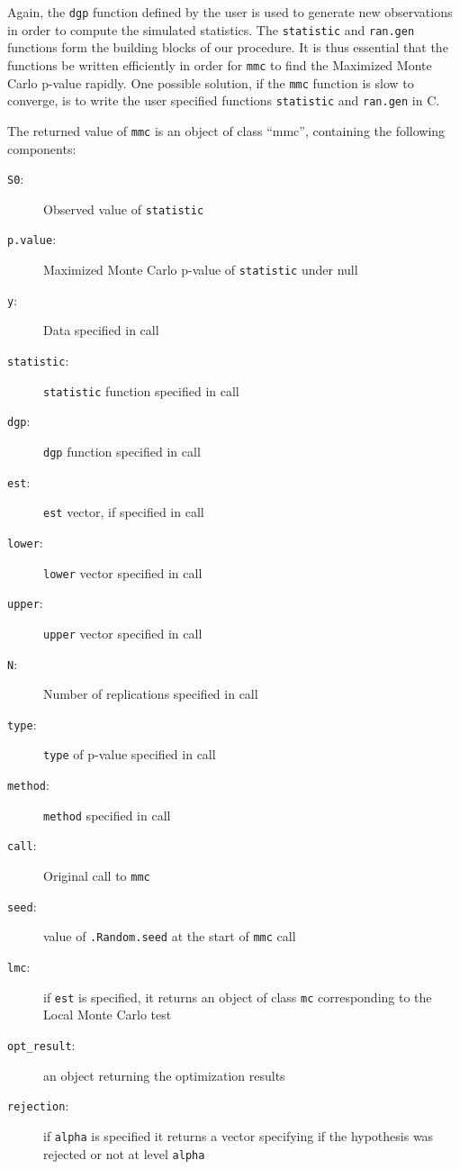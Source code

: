 \documentclass[11pt]{article}\usepackage[]{graphicx}\usepackage[]{color}
\let\proglang=\textsf
\let\code=\texttt
\begin{document}
	Again, the \code{dgp} function defined by the user is used to generate new observations in order to compute the simulated statistics. The \code{statistic} and \code{ran.gen} functions form the building blocks of our procedure. It is thus essential that the functions be written efficiently in order for \code{mmc} to find the Maximized Monte Carlo p-value rapidly. One possible solution, if the \code{mmc} function is slow to converge, is to write the user specified functions \code{statistic} and \code{ran.gen} in \proglang{C}.

	The returned value of \code{mmc} is an object of class ``mmc'', containing the following components:
	\begin{description}
		\item[\code{S0}:] Observed value of \code{statistic}
		\item[\code{p.value}:] Maximized Monte Carlo p-value of \code{statistic} under null
		\item[\code{y}:] Data specified in call
		\item[\code{statistic}:] \code{statistic} function specified in call
		\item[\code{dgp}:] \code{dgp} function specified in call
		\item[\code{est}:] \code{est} vector, if specified in call
		\item[\code{lower}:] \code{lower} vector specified in call
		\item[\code{upper}:] \code{upper} vector specified in call
		\item[\code{N}:] Number of replications specified in call
		\item[\code{type}:] \code{type} of p-value specified in call
		\item[\code{method}:] \code{method} specified in call
		\item[\code{call}:] Original call to \code{mmc}
		\item[\code{seed}:] value of \code{.Random.seed} at the start of \code{mmc} call
		\item[\code{lmc}:] if \code{est} is specified, it returns an object of class \code{mc}
		corresponding to the Local Monte Carlo test
		\item[\code{opt\_result}:] an object returning the optimization results
		\item[\code{rejection}:] if \code{alpha} is specified it returns a vector specifying if the
		hypothesis was rejected or not at level \code{alpha}
	\end{description}
\end{document}
